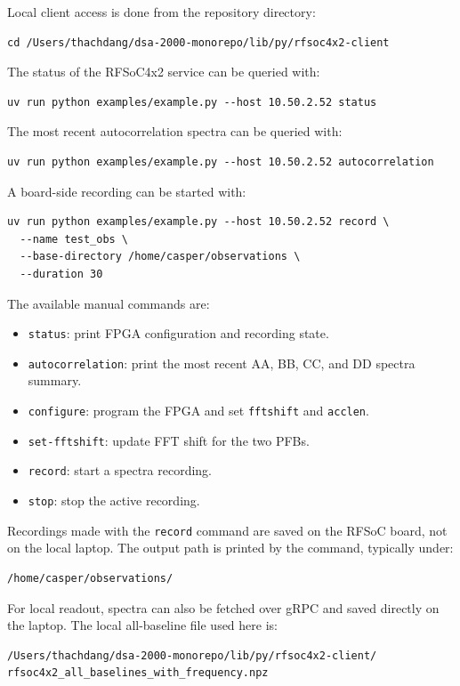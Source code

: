 \documentclass[12pt]{extarticle}
\begin{document}
Local client access is done from the repository directory:
\begin{lstlisting}
cd /Users/thachdang/dsa-2000-monorepo/lib/py/rfsoc4x2-client
\end{lstlisting}

The status of the RFSoC4x2 service can be queried with:
\begin{lstlisting}
uv run python examples/example.py --host 10.50.2.52 status
\end{lstlisting}

The most recent autocorrelation spectra can be queried with:
\begin{lstlisting}
uv run python examples/example.py --host 10.50.2.52 autocorrelation
\end{lstlisting}

A board-side recording can be started with:
\begin{lstlisting}
uv run python examples/example.py --host 10.50.2.52 record \
  --name test_obs \
  --base-directory /home/casper/observations \
  --duration 30
\end{lstlisting}

The available manual commands are:
\begin{itemize}
    \item \texttt{status}: print FPGA configuration and recording state.
    \item \texttt{autocorrelation}: print the most recent AA, BB, CC, and DD spectra summary.
    \item \texttt{configure}: program the FPGA and set \texttt{fftshift} and \texttt{acclen}.
    \item \texttt{set-fftshift}: update FFT shift for the two PFBs.
    \item \texttt{record}: start a spectra recording.
    \item \texttt{stop}: stop the active recording.
\end{itemize}

Recordings made with the \texttt{record} command are saved on the RFSoC board, not on the local laptop. The output path is printed by the command, typically under:
\begin{lstlisting}
/home/casper/observations/
\end{lstlisting}

For local readout, spectra can also be fetched over gRPC and saved directly on the laptop. The local all-baseline file used here is:
\begin{lstlisting}
/Users/thachdang/dsa-2000-monorepo/lib/py/rfsoc4x2-client/
rfsoc4x2_all_baselines_with_frequency.npz
\end{lstlisting}
\end{document}

